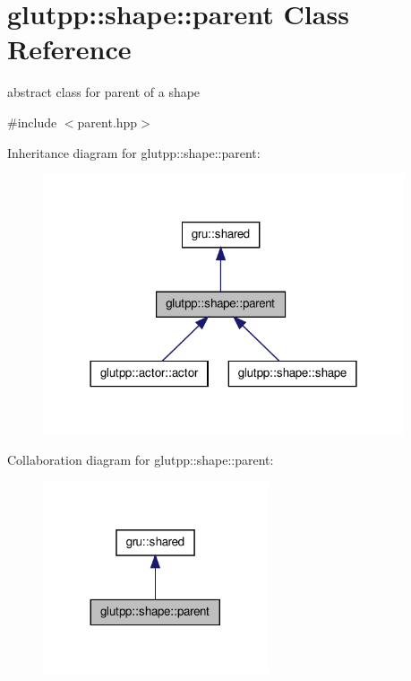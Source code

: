 \hypertarget{classglutpp_1_1shape_1_1parent}{\section{glutpp\-:\-:shape\-:\-:parent \-Class \-Reference}
\label{classglutpp_1_1shape_1_1parent}
}


abstract class for parent of a shape  




{\ttfamily \#include $<$parent.\-hpp$>$}



\-Inheritance diagram for glutpp\-:\-:shape\-:\-:parent\-:
\nopagebreak
\begin{figure}[H]
\begin{center}
\leavevmode
\includegraphics[width=302pt]{classglutpp_1_1shape_1_1parent__inherit__graph}
\end{center}
\end{figure}


\-Collaboration diagram for glutpp\-:\-:shape\-:\-:parent\-:
\nopagebreak
\begin{figure}[H]
\begin{center}
\leavevmode
\includegraphics[width=188pt]{classglutpp_1_1shape_1_1parent__coll__graph}
\end{center}
\end{figure}
